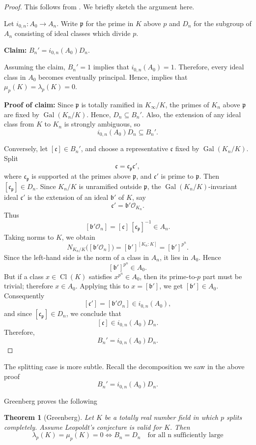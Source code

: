 \documentclass{article}
\numberwithin{equation}{section}
\theoremstyle{plain}  %
\newtheorem{theorem}{Theorem}[section]
\theoremstyle{definition}
\DeclareMathOperator{\Gal}{Gal}
\DeclareMathOperator{\Cl}{Cl}
\newcommand{\mfp}{\mathfrak p}
\newcommand{\fk}{\mathfrak }
\begin{document}
\begin{proof}
    This follows from \cite[Theorem~1]{MR401702}. We briefly sketch the argument here.

    Let $i_{0,n}: A_0\to A_n$. Write $\mfp$ for the prime in $K$ above $p$ and $D_n$ for the subgroup of $A_n$ consisting of ideal classes which divide  $p$. 
    
    \textbf{Claim:} $B_n'= i_{0,n}(A_0) D_n$. 
    
    Assuming the claim, $B_n'=1$ implies that $i_{0,n}(A_0)=1$. Therefore, every ideal class in $A_0$ becomes eventually principal. Hence, \cite[Theorem~1]{MR401702} implies that $\mu_p(K)=\lambda_p(K)=0$.

    \textbf{Proof of claim:} Since $\fk p$ is totally ramified in $K_\infty/K$, the primes of
$K_n$ above $\fk p$ are fixed by $\Gal(K_n/K)$. Hence,
$D_n\subseteq B_n'$. Also, the extension of any ideal class from
$K$ to $K_n$ is strongly ambiguous, so
$$
i_{0,n}(A_0)D_n\subseteq B_n'.
$$

Conversely, let $[\fk c]\in B_n'$, and choose a representative
$\fk c$ fixed by $\Gal(K_n/K)$. Split
$$
\fk c=\fk c_{\fk p}\fk c',
$$
where $\fk c_{\fk p}$ is supported at the primes above
$\fk p$, and $\fk c'$ is prime to $\fk p$. Then
$[\fk c_{\fk p}]\in D_n$. Since $K_n/K$ is unramified outside
$\fk p$, the $\Gal(K_n/K)$-invariant ideal $\fk c'$ is the extension of
an ideal $\fk b'$ of $K$, say
$$
\fk c'=\fk b'\mathcal O_{K_n}.
$$
Thus
$$
[\fk b'\mathcal O_n]
=
[\fk c]\,[\fk c_{\fk p}]^{-1}\in A_n.
$$
Taking norms to $K$, we obtain
$$
N_{K_n/K}\bigl([\fk b'\mathcal O_n]\bigr)
=
[\fk b']^{[K_n:K]}
=
[\fk b']^{p^n}.
$$
Since the left-hand side is the norm of a class in $A_n$, it lies in
$A_0$. Hence
$$
[\fk b']^{p^n}\in A_0.
$$
But if a class $x\in \Cl(K)$ satisfies $x^{p^n}\in A_0$, then its
prime-to-$p$ part must be trivial; therefore $x\in A_0$. Applying this to
$x=[\fk b']$, we get $[\fk b']\in A_0$. Consequently
$$
[\fk c']
=
[\fk b'\mathcal O_n]
\in i_{0,n}(A_0),
$$
and since $[\fk c_{\fk p}]\in D_n$, we conclude that
$$
[\fk c]\in i_{0,n}(A_0)D_n.
$$
Therefore,
$$
B_n'=i_{0,n}(A_0)D_n.
$$
    
\end{proof}


 The splitting case is more subtle. Recall the decomposition we saw in the above proof $$B_n'=i_{0,n}(A_0)D_n.$$


Greenberg proves the following

\begin{theorem}[Greenberg] \label{th: Greenberg non split}
    Let $K$ be a totally real number field  in which $p$ splits completely. Assume Leopoldt's conjecture is valid for $K$. Then $$\lambda_p(K)=\mu_p(K)=0 \iff B_n=D_n \quad \text{for all n sufficiently large}  $$
\end{theorem}
\end{document}
